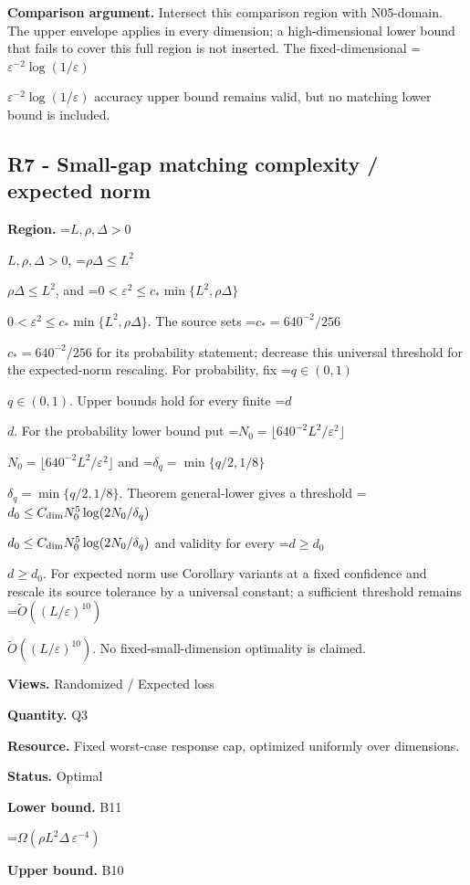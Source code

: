 \documentclass[10pt,a4paper]{article}
\newcommand{\AtlasMath}[1]{\par\begingroup\centering\setbox0=\hbox{$\displaystyle #1$}\ifdim\wd0>1.4\linewidth\typeout{ATLAS WIDE FORMULA: \the\wd0}\fi\ifdim\wd0>\linewidth\resizebox{\linewidth}{!}{\box0}\else\box0\fi\par\endgroup}
\newcommand{\AtlasInlineMath}[1]{\begingroup\setbox0=\hbox{$#1$}\ifdim\wd0>.4\linewidth\endgroup\AtlasMath{#1}\else\endgroup$#1$\fi}
\begin{document}
\textbf{Comparison argument.} Intersect this comparison region with N05-domain. The upper envelope applies in every dimension; a high-dimensional lower bound that fails to cover this full region is not inserted. The fixed-dimensional \AtlasInlineMath{\varepsilon^{-2}\log(1/\varepsilon)} accuracy upper bound remains valid, but no matching lower bound is included.



\subsection{R7 - Small-gap matching complexity / expected norm}


\textbf{Region.} \AtlasInlineMath{L,\rho,\Delta>0}, \AtlasInlineMath{\rho\Delta\le L^2}, and \AtlasInlineMath{0<\varepsilon^2\le c_*\min\{L^2,\rho\Delta\}}. The source sets \AtlasInlineMath{c_*=640^{-2}/256} for its probability statement; decrease this universal threshold for the expected-norm rescaling. For probability, fix \AtlasInlineMath{q\in(0,1)}. Upper bounds hold for every finite \AtlasInlineMath{d}. For the probability lower bound put \AtlasInlineMath{N_0=\lfloor640^{-2}L^2/\varepsilon^2\rfloor} and \AtlasInlineMath{\delta_q=\min\{q/2,1/8\}}. Theorem general-lower gives a threshold \AtlasInlineMath{d_0\le C_{\rm dim}N_0^5\log(2N_0/\delta_q)} and validity for every \AtlasInlineMath{d\ge d_0}. For expected norm use Corollary variants at a fixed confidence and rescale its source tolerance by a universal constant; a sufficient threshold remains \AtlasInlineMath{\widetilde O((L/\varepsilon)^{10})}. No fixed-small-dimension optimality is claimed.



\textbf{Views.} Randomized / Expected loss



\textbf{Quantity.} Q3



\textbf{Resource.} Fixed worst-case response cap, optimized uniformly over dimensions.



\textbf{Status.} Optimal



\textbf{Lower bound.} B11



\AtlasMath{\Omega(\rho L^2\Delta\,\varepsilon^{-4})}


\textbf{Upper bound.} B10
\end{document}

